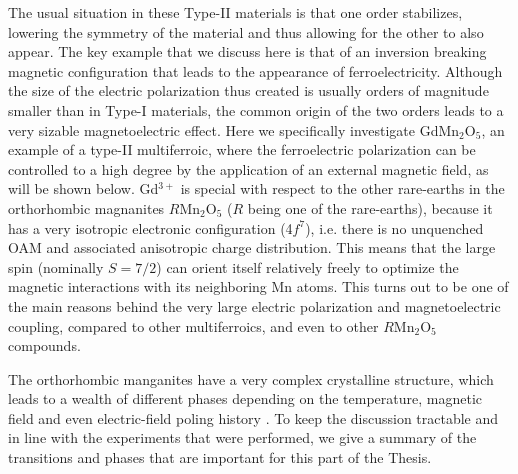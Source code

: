 The usual situation in these Type-II materials is that one order stabilizes, lowering the symmetry of the material and thus allowing for the other to also appear.
The key example that we discuss here is that of an inversion breaking magnetic configuration that leads to the appearance of ferroelectricity.
Although the size of the electric polarization thus created is usually orders of magnitude smaller than in Type-I materials, the common origin of the two orders leads to a very sizable magnetoelectric effect.
Here we specifically investigate GdMn$_2$O$_5$, an example of a type-II multiferroic\cite{Khomskii2009}, where the ferroelectric polarization can be controlled to a high degree by the application of an external magnetic field, as will be shown below.
Gd$^{3+}$ is special with respect to the other rare-earths in the orthorhombic magnanites $R$Mn$_2$O$_5$ ($R$ being one of the rare-earths), because it has a very isotropic electronic configuration (4$f^7$), i.e. there is no unquenched OAM and associated anisotropic charge distribution. This means that the large spin (nominally $S=7/2$) can orient itself relatively freely to optimize the magnetic interactions with its neighboring Mn atoms.
This turns out to be one of the main reasons behind the very large electric polarization and magnetoelectric coupling, compared to other multiferroics, and even to other $R$Mn$_2$O$_5$ compounds.

The orthorhombic manganites have a very complex crystalline structure, which leads to a wealth of different phases depending on the temperature, magnetic field and even electric-field poling history \cite{Zheng2019}.
To keep the discussion tractable and in line with the experiments that were performed, we give a summary of the transitions and phases that are important for this part of the Thesis.

